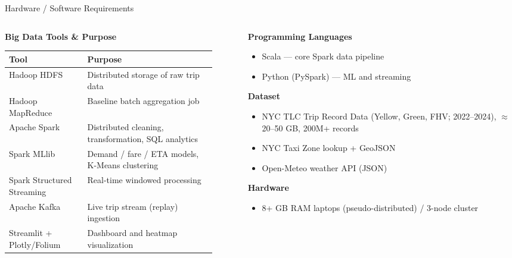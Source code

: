 \documentclass[aspectratio=169]{beamer}
\begin{document}
\begin{frame}{Hardware / Software Requirements}
  \small
  \begin{columns}[T]
    \begin{column}{0.58\textwidth}
      \textbf{Big Data Tools \& Purpose}
      \begin{tabular}{p{0.34\linewidth} p{0.56\linewidth}}
        \toprule
        \textbf{Tool} & \textbf{Purpose} \\
        \midrule
        Hadoop HDFS & Distributed storage of raw trip data \\
        Hadoop MapReduce & Baseline batch aggregation job \\
        Apache Spark & Distributed cleaning, transformation, SQL analytics \\
        Spark MLlib & Demand / fare / ETA models, K-Means clustering \\
        Spark Structured Streaming & Real-time windowed processing \\
        Apache Kafka & Live trip stream (replay) ingestion \\
        Streamlit + Plotly/Folium & Dashboard and heatmap visualization \\
        \bottomrule
      \end{tabular}
    \end{column}
    \begin{column}{0.40\textwidth}
      \textbf{Programming Languages}
      \begin{itemize}\itemsep2pt
        \item Scala --- core Spark data pipeline
        \item Python (PySpark) --- ML and streaming
      \end{itemize}
      \textbf{Dataset}
      \begin{itemize}\itemsep2pt
        \item NYC TLC Trip Record Data (Yellow, Green, FHV; 2022--2024),
              $\approx$ 20--50 GB, 200M+ records
        \item NYC Taxi Zone lookup + GeoJSON
        \item Open-Meteo weather API (JSON)
      \end{itemize}
      \textbf{Hardware}
      \begin{itemize}\itemsep2pt
        \item 8+ GB RAM laptops (pseudo-distributed) / 3-node cluster
      \end{itemize}
    \end{column}
  \end{columns}
\end{frame}
\end{document}
